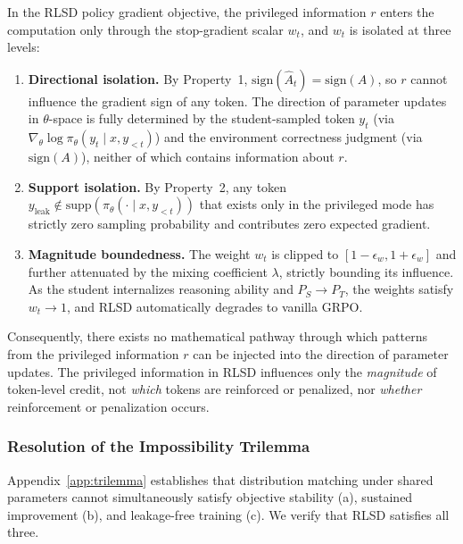 \documentclass[]{jingdong}
\begin{document}
\begin{theorem}
\label{thm:leakage-free}
In the RLSD policy gradient objective, the privileged information $r$ enters the computation only through the stop-gradient scalar $w_t$, and $w_t$ is isolated at three levels:
\begin{enumerate}[label=(\roman*),nosep]
    \item \textbf{Directional isolation.} By Property~1, $\mathrm{sign}(\hat{A}_t) = \mathrm{sign}(A)$, so $r$ cannot influence the gradient sign of any token. The direction of parameter updates in $\theta$-space is fully determined by the student-sampled token $y_t$ (via $\nabla_\theta \log \pi_\theta(y_t \mid x, y_{<t})$) and the environment correctness judgment (via $\mathrm{sign}(A)$), neither of which contains information about $r$.
    \item \textbf{Support isolation.} By Property~2, any token $y_{\mathrm{leak}} \notin \mathrm{supp}(\pi_\theta(\cdot \mid x, y_{<t}))$ that exists only in the privileged mode has strictly zero sampling probability and contributes zero expected gradient.
    \item \textbf{Magnitude boundedness.} The weight $w_t$ is clipped to $[1 - \epsilon_w, 1 + \epsilon_w]$ and further attenuated by the mixing coefficient $\lambda$, strictly bounding its influence. As the student internalizes reasoning ability and $P_S \to P_T$, the weights satisfy $w_t \to 1$, and RLSD automatically degrades to vanilla GRPO.
\end{enumerate}
Consequently, there exists no mathematical pathway through which patterns from the privileged information $r$ can be injected into the direction of parameter updates. The privileged information in RLSD influences only the \textit{magnitude} of token-level credit, not \textit{which} tokens are reinforced or penalized, nor \textit{whether} reinforcement or penalization occurs.
\end{theorem}



\subsubsection{Resolution of the Impossibility Trilemma}

Appendix~\ref{app:trilemma} establishes that distribution matching under shared parameters cannot simultaneously satisfy objective stability (a), sustained improvement (b), and leakage-free training (c). We verify that RLSD satisfies all three.
\end{document}
